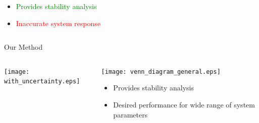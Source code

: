 \begin{frame}
\begin{columns}
\begin{column}[t]{0.48\linewidth}
            \begin{itemize}
                \item \textcolor{green}{Provides stability analysis}
                \item \textcolor{red}{Inaccurate system response}
            \end{itemize}
        \end{column}
    \end{columns}
\end{frame}



\begin{frame}{Our Method}
    \begin{columns}
        \begin{column}[]{0.48\linewidth}
            \texttt{[image: with\_uncertainty.eps]}
        \end{column}
        \begin{column}[]{0.5\linewidth}
            \texttt{[image: venn\_diagram\_general.eps]}
            \begin{itemize}
                \item Provides stability analysis 
                \item Desired performance for wide range of system parameters
            \end{itemize}
        \end{column}
    \end{columns}
\end{frame}


